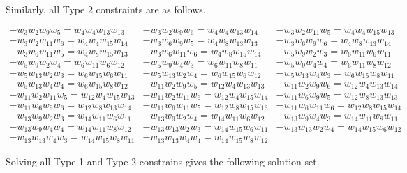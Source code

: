 \documentclass[12pt]{article}
\theoremstyle{plain}
\theoremstyle{definition}
\theoremstyle{remark}
\theoremstyle{definition}
\begin{document}
Similarly, all Type 2 constraints are as follows.

\begin{eqnarray*}
        -w_{3}w_{2}w_{9}w_{5} = w_{4}w_{4}w_{13}w_{13} & -w_{3}w_{2}w_{9}w_{6} = w_{4}w_{4}w_{13}w_{14} & -w_{3}w_{2}w_{11}w_{5} = w_{4}w_{4}w_{15}w_{13} \\
        -w_{3}w_{2}w_{11}w_{6} = w_{4}w_{4}w_{15}w_{14} & -w_{3}w_{6}w_{9}w_{5} = w_{4}w_{8}w_{13}w_{13} & -w_{3}w_{6}w_{9}w_{6} = w_{4}w_{8}w_{13}w_{14} \\
        -w_{3}w_{6}w_{11}w_{5} = w_{4}w_{8}w_{15}w_{13} & -w_{3}w_{6}w_{11}w_{6} = w_{4}w_{8}w_{15}w_{14} & -w_{5}w_{9}w_{2}w_{3} = w_{6}w_{11}w_{6}w_{11} \\
        -w_{5}w_{9}w_{2}w_{4} = w_{6}w_{11}w_{6}w_{12} & -w_{5}w_{9}w_{4}w_{3} = w_{6}w_{11}w_{8}w_{11} & -w_{5}w_{9}w_{4}w_{4} = w_{6}w_{11}w_{8}w_{12} \\
        -w_{5}w_{13}w_{2}w_{3} = w_{6}w_{15}w_{6}w_{11} & -w_{5}w_{13}w_{2}w_{4} = w_{6}w_{15}w_{6}w_{12} & -w_{5}w_{13}w_{4}w_{3} = w_{6}w_{15}w_{8}w_{11} \\
        -w_{5}w_{13}w_{4}w_{4} = w_{6}w_{15}w_{8}w_{12} & -w_{11}w_{2}w_{9}w_{5} = w_{12}w_{4}w_{13}w_{13} & -w_{11}w_{2}w_{9}w_{6} = w_{12}w_{4}w_{13}w_{14} \\
        -w_{11}w_{2}w_{11}w_{5} = w_{12}w_{4}w_{15}w_{13} & -w_{11}w_{2}w_{11}w_{6} = w_{12}w_{4}w_{15}w_{14} & -w_{11}w_{6}w_{9}w_{5} = w_{12}w_{8}w_{13}w_{13} \\
        -w_{11}w_{6}w_{9}w_{6} = w_{12}w_{8}w_{13}w_{14} & -w_{11}w_{6}w_{11}w_{5} = w_{12}w_{8}w_{15}w_{13} & -w_{11}w_{6}w_{11}w_{6} = w_{12}w_{8}w_{15}w_{14} \\
        -w_{13}w_{9}w_{2}w_{3} = w_{14}w_{11}w_{6}w_{11} & -w_{13}w_{9}w_{2}w_{4} = w_{14}w_{11}w_{6}w_{12} & -w_{13}w_{9}w_{4}w_{3} = w_{14}w_{11}w_{8}w_{11} \\
        -w_{13}w_{9}w_{4}w_{4} = w_{14}w_{11}w_{8}w_{12} & -w_{13}w_{13}w_{2}w_{3} = w_{14}w_{15}w_{6}w_{11} & -w_{13}w_{13}w_{2}w_{4} = w_{14}w_{15}w_{6}w_{12} \\
        -w_{13}w_{13}w_{4}w_{3} = w_{14}w_{15}w_{8}w_{11} & -w_{13}w_{13}w_{4}w_{4} = w_{14}w_{15}w_{8}w_{12} & 
\end{eqnarray*}

Solving all Type 1 and Type 2 constrains gives the following solution set.
\end{document}
